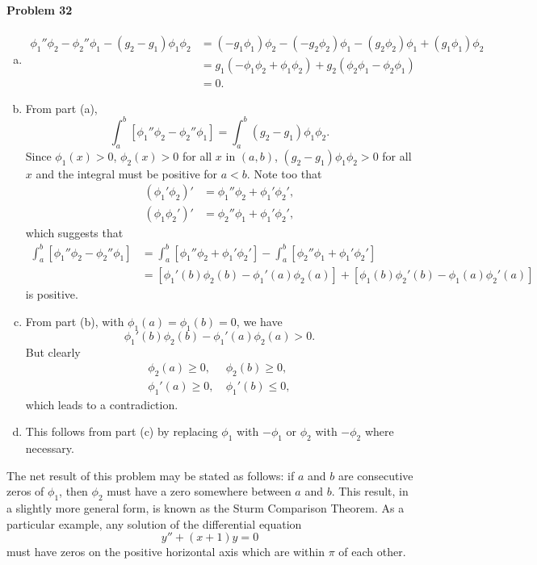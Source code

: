 \documentclass{article}
\begin{document}
\paragraph{Problem 32}
\begin{enumerate}[(a)]
  \item
    \begin{align*}
      \phi_1''\phi_2 - \phi_2''\phi_1 - (g_2 - g_1)\phi_1\phi_2
      &= (-g_1\phi_1)\phi_2 - (-g_2\phi_2)\phi_1
        - (g_2\phi_2)\phi_1 + (g_1\phi_1)\phi_2 \\
      &= g_1(-\phi_1\phi_2 + \phi_1\phi_2) + g_2(\phi_2\phi_1 - \phi_2\phi_1) \\
      &= 0.
    \end{align*}
  \item From part (a), \[
      \int_a^b [\phi_1''\phi_2 - \phi_2''\phi_1]
      = \int_a^b (g_2 - g_1)\phi_1\phi_2.
    \] Since $\phi_1(x) > 0$, $\phi_2(x) > 0$ for all $x$ in $(a, b)$, $(g_2 -
    g_1)\phi_1\phi_2 > 0$ for all $x$ and the integral must be positive for $a
    < b$. Note too that
    \begin{align*}
      (\phi_1'\phi_2)' &= \phi_1''\phi_2 + \phi_1'\phi_2', \\
      (\phi_1\phi_2')' &= \phi_2''\phi_1 + \phi_1'\phi_2',
    \end{align*}
    which suggests that
    \begin{align*}
      \int_a^b [\phi_1''\phi_2 - \phi_2''\phi_1]
      &= \int_a^b [\phi_1''\phi_2 + \phi_1'\phi_2']
      - \int_a^b [\phi_2''\phi_1 + \phi_1'\phi_2'] \\
      &= [\phi_1'(b)\phi_2(b) - \phi_1'(a)\phi_2(a)]
      + [\phi_1(b)\phi_2'(b) - \phi_1(a)\phi_2'(a)]
    \end{align*}
    is positive.
  \item From part (b), with $\phi_1(a) = \phi_1(b) = 0$, we have \[
      \phi_1'(b)\phi_2(b) - \phi_1'(a)\phi_2(a) > 0.
    \] But clearly
    \begin{align*}
      \phi_2(a) \geq 0,  \: &\phi_2(b) \geq 0, \\
      \phi_1'(a) \geq 0, \: &\phi_1'(b) \leq 0,
    \end{align*}
    which leads to a contradiction.
  \item This follows from part (c) by replacing $\phi_1$ with $-\phi_1$ or
    $\phi_2$ with $-\phi_2$ where necessary.
\end{enumerate}

The net result of this problem may be stated as follows: if $a$ and $b$ are
consecutive zeros of $\phi_1$, then $\phi_2$ must have a zero somewhere between
$a$ and $b$. This result, in a slightly more general form, is known as the
Sturm Comparison Theorem. As a particular example, any solution of the
differential equation \[
  y'' + (x + 1)y = 0
\] must have zeros on the positive horizontal axis which are within $\pi$ of
each other.
\end{document}
